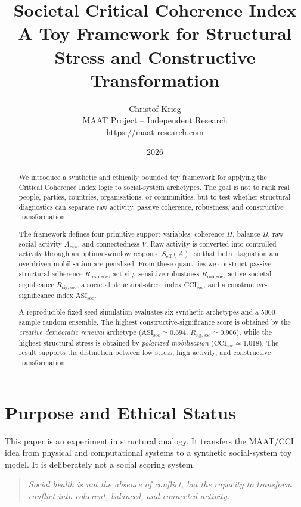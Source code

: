 \documentclass[11pt,a4paper]{article}
\title{
\textbf{Societal Critical Coherence Index}\\[0.4em]
\large A Toy Framework for Structural Stress and Constructive Transformation
}
\author{
Christof Krieg\\
\small MAAT Project -- Independent Research\\
\small \url{https://maat-research.com}
}
\date{2026}
\newcommand{\CCIsoc}{\mathrm{CCI}_{\mathrm{soc}}}
\newcommand{\ASIsoc}{\mathrm{ASI}_{\mathrm{soc}}}
\newcommand{\Seff}{S_{\mathrm{eff}}}
\newcommand{\Rresp}{R_{\mathrm{resp,soc}}}
\newcommand{\Rrob}{R_{\mathrm{rob,soc}}}
\newcommand{\Rsig}{R_{\mathrm{sig,soc}}}
\begin{document}
\maketitle

\begin{abstract}
We introduce a synthetic and ethically bounded toy framework for applying
the Critical Coherence Index logic to social-system archetypes.
The goal is not to rank real people, parties, countries, organisations, or
communities, but to test whether structural diagnostics can separate raw
activity, passive coherence, robustness, and constructive transformation.

The framework defines four primitive support variables: coherence $H$,
balance $B$, raw social activity $A_{\mathrm{raw}}$, and connectedness $V$.
Raw activity is converted into controlled activity through an optimal-window
response $\Seff(A)$, so that both stagnation and overdriven mobilisation are
penalised.
From these quantities we construct passive structural adherence $\Rresp$,
activity-sensitive robustness $\Rrob$, active societal significance $\Rsig$,
a societal structural-stress index $\CCIsoc$, and a constructive-significance
index $\ASIsoc$.

A reproducible fixed-seed simulation evaluates six synthetic archetypes and a
5000-sample random ensemble.
The highest constructive-significance score is obtained by the
\emph{creative democratic renewal} archetype
($\ASIsoc\simeq0.694$, $\Rsig\simeq0.906$), while the highest structural
stress is obtained by \emph{polarized mobilisation}
($\CCIsoc\simeq1.018$).
The result supports the distinction between low stress, high activity, and
constructive transformation.
\end{abstract}

\section{Purpose and Ethical Status}

This paper is an experiment in structural analogy.
It transfers the MAAT/CCI idea from physical and computational systems to a
synthetic social-system toy model.
It is deliberately not a social scoring system.

\begin{quote}
\emph{Social health is not the absence of conflict, but the capacity to
transform conflict into coherent, balanced, and connected activity.}
\end{quote}
\end{document}
